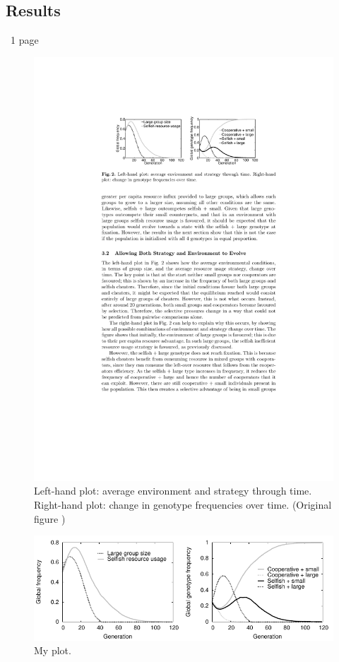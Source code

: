 \documentclass[11pt]{article}
\begin{document}
\subsection{Results}
~1 page

\begin{figure}[!ht]
  \centering
  \includegraphics[scale=1.25]{original.pdf}
  \caption{Left-hand plot: average environment and strategy through time. Right-hand plot: change in genotype frequencies over time. (Original figure \citep{orig})}
  \label{fig:original}
\end{figure}

\begin{figure}[!ht]
  \centering
  \includegraphics{equalplot.pdf}
  \caption{My plot.}
  \label{fig:equalplot}
\end{figure}
\end{document}
